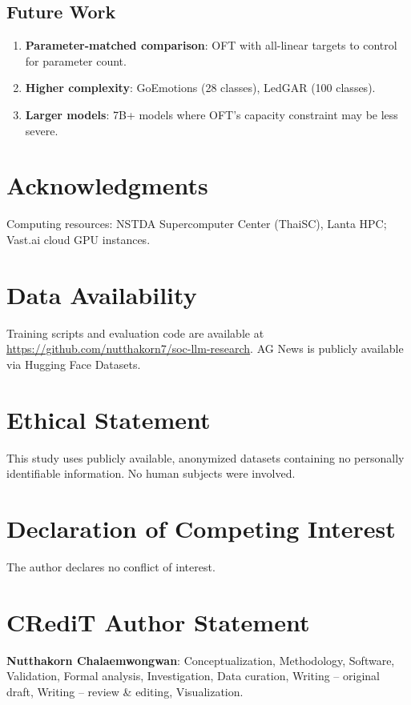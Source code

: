\documentclass[review,3p]{elsarticle}
\begin{document}
\subsection{Future Work}
\begin{enumerate}
\item \textbf{Parameter-matched comparison}: OFT with all-linear targets to control for parameter count.
\item \textbf{Higher complexity}: GoEmotions (28 classes), LedGAR (100 classes).
\item \textbf{Larger models}: 7B+ models where OFT's capacity constraint may be less severe.
\end{enumerate}

\section*{Acknowledgments}
Computing resources: NSTDA Supercomputer Center (ThaiSC), Lanta HPC; Vast.ai cloud GPU instances.

\section*{Data Availability}
Training scripts and evaluation code are available at \url{https://github.com/nutthakorn7/soc-llm-research}. AG News is publicly available via Hugging Face Datasets.

\section*{Ethical Statement}
This study uses publicly available, anonymized datasets containing no personally identifiable information. No human subjects were involved.

\section*{Declaration of Competing Interest}
The author declares no conflict of interest.

\section*{CRediT Author Statement}
\textbf{Nutthakorn Chalaemwongwan}: Conceptualization, Methodology, Software, Validation, Formal analysis, Investigation, Data curation, Writing -- original draft, Writing -- review \& editing, Visualization.
\end{document}
